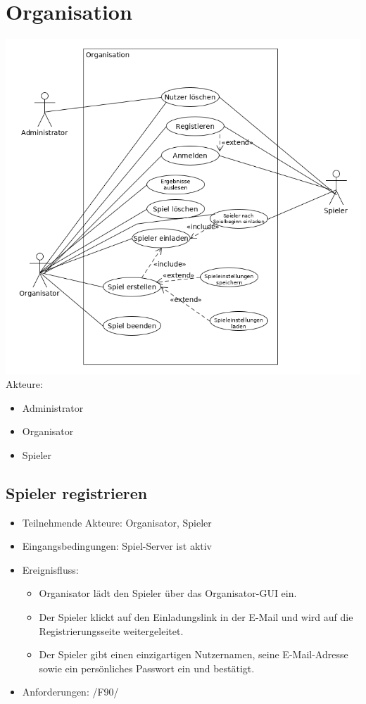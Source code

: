 \documentclass[a4paper]{scrreprt}
\begin{document}
    \section{Organisation}
    \includegraphics[width=\textwidth]{uml/export/Organisation.png}
    Akteure:
    \begin{itemize}
        \item \Gls{Administrator}
        \item \Gls{Organisator}
        \item \Gls{Spieler}
    \end{itemize}
    \newpage
   \subsection{Spieler registrieren}
    \begin{itemize}
        \item Teilnehmende Akteure: \Gls{Organisator}, \Gls{Spieler}
        \item Eingangsbedingungen: Spiel-Server ist aktiv
        \item Ereignisfluss:
        \begin{itemize}
            \item \Gls{Organisator} lädt den \Gls{Spieler} über das Organisator-GUI ein.
            \item Der \Gls{Spieler} klickt auf den Einladungslink in der E-Mail und wird auf die Registrierungsseite weitergeleitet.
            \item Der \Gls{Spieler} gibt einen einzigartigen Nutzernamen, seine E-Mail-Adresse sowie ein persönliches Passwort ein und bestätigt.
        \end{itemize}
        \item Anforderungen: /F90/
    \end{itemize}
\end{document}
